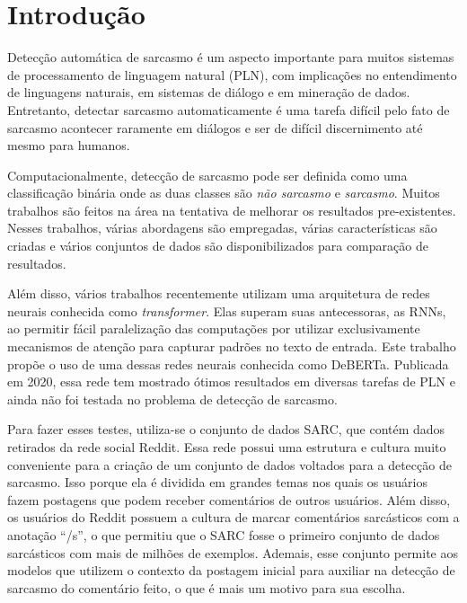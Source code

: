 

\chapter{Introdução}%
\label{cha:introducao}

Detecção automática de sarcasmo é um aspecto importante para muitos sistemas de
processamento de linguagem natural (PLN), com implicações no entendimento de
linguagens naturais, em sistemas de diálogo e em mineração de dados. Entretanto,
detectar sarcasmo automaticamente é uma tarefa difícil pelo fato de sarcasmo
acontecer raramente em diálogos e ser de difícil discernimento até mesmo para
humanos. \citep{wallace-etal:2014:ironic-context}

Computacionalmente, detecção de sarcasmo pode ser definida como uma
classificação binária onde as duas classes são \textit{não sarcasmo} e
\textit{sarcasmo}. Muitos trabalhos são feitos na área na tentativa de melhorar
os resultados pre-existentes. Nesses trabalhos, várias abordagens são
empregadas, várias características são criadas e vários conjuntos de dados são
disponibilizados para comparação de resultados.

Além disso, vários trabalhos recentemente utilizam uma arquitetura de redes
neurais conhecida como \textit{transformer}. Elas superam suas antecessoras, as
RNNs, ao permitir fácil paralelização das computações por utilizar
exclusivamente mecanismos de atenção para capturar padrões no texto de entrada.
Este trabalho propõe o uso de uma dessas redes neurais conhecida como DeBERTa.
Publicada em 2020, essa rede tem mostrado ótimos resultados em diversas tarefas
de PLN e ainda não foi testada no problema de detecção de
sarcasmo. \citep{vaswani-etal:2017:attention-is-all-you-need,
he-etal:2020:deberta, he-etal:2021:debertav3}

Para fazer esses testes, utiliza-se o conjunto de dados SARC, que contém dados
retirados da rede social Reddit. Essa rede possui uma estrutura e cultura muito
conveniente para a criação de um conjunto de dados voltados para a detecção de
sarcasmo. Isso porque ela é dividida em grandes temas nos quais os usuários
fazem postagens que podem receber comentários de outros usuários. Além disso, os
usuários do Reddit possuem a cultura de marcar comentários sarcásticos com a
anotação ``/s'', o que permitiu que o SARC fosse o primeiro conjunto de dados
sarcásticos com mais de milhões de exemplos. Ademais, esse conjunto permite aos
modelos que utilizem o contexto da postagem inicial para auxiliar na detecção de
sarcasmo do comentário feito, o que é mais um motivo para sua escolha.
\citep{khodak-etal:2017:sarc}

